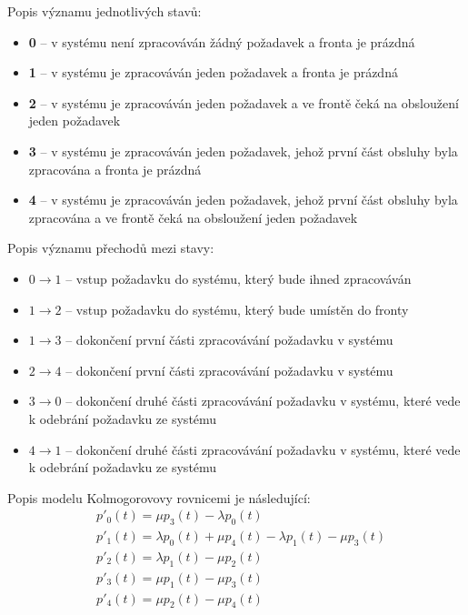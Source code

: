 \documentclass[12pt, a4paper]{article}
\begin{document}
\noindent Popis významu jednotlivých stavů:
\begin{itemize}
    \item \textbf{0} -- v systému není zpracováván žádný požadavek a fronta je prázdná
    \item \textbf{1} -- v systému je zpracováván jeden požadavek a fronta je prázdná
    \item \textbf{2} -- v systému je zpracováván jeden požadavek a ve frontě čeká na obsloužení jeden požadavek
    \item \textbf{3} -- v systému je zpracováván jeden požadavek, jehož první část obsluhy byla zpracována a fronta je prázdná
    \item \textbf{4} -- v systému je zpracováván jeden požadavek, jehož první část obsluhy byla zpracována a ve frontě čeká na obsloužení jeden požadavek
\end{itemize}

\noindent Popis významu přechodů mezi stavy:
\begin{itemize}
    \item $0 \rightarrow 1$ -- vstup požadavku do systému, který bude ihned zpracováván
    \item $1 \rightarrow 2$ -- vstup požadavku do systému, který bude umístěn do fronty
    \item $1 \rightarrow 3$ -- dokončení první části zpracovávání požadavku v systému
    \item $2 \rightarrow 4$ -- dokončení první části zpracovávání požadavku v systému
    \item $3 \rightarrow 0$ -- dokončení druhé části zpracovávání požadavku v systému, které vede k odebrání požadavku ze systému
    \item $4 \rightarrow 1$ -- dokončení druhé části zpracovávání požadavku v systému, které vede k odebrání požadavku ze systému
\end{itemize}

\noindent Popis modelu Kolmogorovovy rovnicemi je následující:
\begin{equation}
    \begin{split}
    & p'_{0}(t) = \mu p_{3}(t) - \lambda p_{0}(t) \\
    & p'_{1}(t) = \lambda p_{0}(t) + \mu p_{4}(t) - \lambda p_{1}(t) - \mu p_{3}(t) \\
    & p'_{2}(t) = \lambda p_{1}(t) - \mu p_{2}(t) \\
    & p'_{3}(t) = \mu p_{1}(t) - \mu p_{3}(t) \\
    & p'_{4}(t) = \mu p_{2}(t) - \mu p_{4}(t) \\
    \end{split}
\end{equation}
\end{document}
